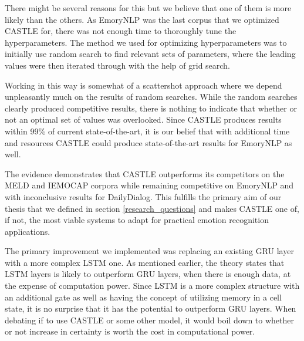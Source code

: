 \documentclass[nofilelist]{cslthse-msc}
\begin{document}
There might be several reasons for this but we believe that one of them is more likely than the others. As EmoryNLP was the last corpus that we optimized CASTLE for, there was not enough time to thoroughly tune the hyperparameters. The method we used for optimizing hyperparameters was to initially use random search to find relevant sets of parameters, where the leading values were then iterated through with the help of grid search. 

Working in this way is somewhat of a scattershot approach where we depend unpleasantly much on the results of random searches. While the random searches clearly produced competitive results, there is nothing to indicate that whether or not an optimal set of values was overlooked. Since CASTLE produces results within 99$\%$ of current state-of-the-art, it is our belief that with additional time and resources CASTLE could produce state-of-the-art results for EmoryNLP as well. 

The evidence demonstrates that CASTLE outperforms its competitors on the MELD and IEMOCAP corpora while remaining competitive on EmoryNLP and with inconclusive results for DailyDialog. This fulfills the primary aim of our thesis that we defined in section \ref{research_questions} and makes CASTLE one of, if not, the most viable systems to adapt for practical emotion recognition applications.

The primary improvement we implemented was replacing an existing GRU layer with a more complex LSTM one. As mentioned earlier, the theory states that LSTM layers is likely to outperform GRU layers, when there is enough data, at the expense of computation power. Since LSTM is a more complex structure with an additional gate as well as having the concept of utilizing memory in a cell state, it is no surprise that it has the potential to outperform GRU layers. When debating if to use CASTLE or some other model, it would boil down to whether or not increase in certainty is worth the cost in computational power. 







\end{document}
